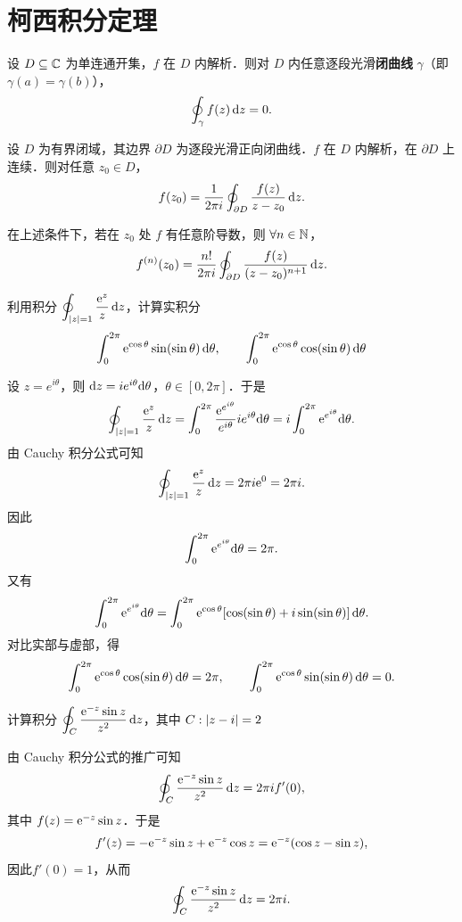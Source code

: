 \documentclass[12pt, a4paper, oneside, UTF8]{ctexbook}
\begin{document}
\section{柯西积分定理}

\begin{theorem}
设 $D\subseteq\mathbb{C}$ 为单连通开集，$f$ 在 $D$ 内解析．则对 $D$ 内任意逐段光滑\textbf{闭曲线} $\gamma$（即 $\gamma(a)=\gamma(b)$），
\[
\oint_\gamma f(z)\,\mathrm{d} z = 0.
\]
\end{theorem}

\begin{theorem}
设 $D$ 为有界闭域，其边界 $\partial D$ 为逐段光滑正向闭曲线．$f$ 在 $D$ 内解析，在 $\partial D$ 上连续．则对任意 $z_0\in D$，
\[
f(z_0) = \frac{1}{2\pi i}\oint_{\partial D}\frac{f(z)}{z-z_0}\,\mathrm{d} z.
\]
\end{theorem}

\begin{theorem}
在上述条件下，若在 $z_0$ 处 $f$ 有任意阶导数，则 $\forall n\in\mathbb{N}$，
\[
f^{(n)}(z_0) = \frac{n!}{2\pi i}\oint_{\partial D}\frac{f(z)}{(z-z_0)^{n+1}}\,\mathrm{d} z.
\]
\end{theorem}
\begin{example}
    利用积分 $\displaystyle\oint_{\abs{z}=1}\frac{\mathrm{e}^z}{z}\,\mathrm{d} z$，计算实积分
    \[\int_0^{2\pi}\mathrm{e}^{\cos\theta}\sin(\sin\theta)\,\mathrm{d} \theta,\qquad\int_0^{2\pi}\mathrm{e}^{\cos\theta}\cos(\sin\theta)\,\mathrm{d} \theta\]
\end{example}
\begin{solution}
    
    设 $z = e^{i\theta}$，则 $\mathrm{d} z = i e^{i\theta}\mathrm{d}\theta$，$\theta\in[0,2\pi]$．于是
    \[
    \oint_{\abs{z}=1}\frac{\mathrm{e}^z}{z}\,\mathrm{d} z = \int_0^{2\pi}\frac{\mathrm{e}^{e^{i\theta}}}{e^{i\theta}} i e^{i\theta}\mathrm{d}\theta = i\int_0^{2\pi}\mathrm{e}^{e^{i\theta}}\mathrm{d}\theta.
    \]
    由 Cauchy 积分公式可知
    \[
    \oint_{\abs{z}=1}\frac{\mathrm{e}^z}{z}\,\mathrm{d} z = 2\pi i\mathrm{e}^0 = 2\pi i.
    \]
    因此
    \[
    \int_0^{2\pi}\mathrm{e}^{e^{i\theta}}\mathrm{d}\theta = 2\pi.
    \]
    又有
    \[
    \int_0^{2\pi}\mathrm{e}^{e^{i\theta}}\mathrm{d}\theta = \int_0^{2\pi}\mathrm{e}^{\cos\theta}[\cos(\sin\theta)+i\sin(\sin\theta)]\,\mathrm{d} \theta.
    \]
    对比实部与虚部，得
    \[
    \int_0^{2\pi}\mathrm{e}^{\cos\theta}\cos(\sin\theta)\,\mathrm{d} \theta = 2\pi,\qquad
    \int_0^{2\pi}\mathrm{e}^{\cos\theta}\sin(\sin\theta)\,\mathrm{d} \theta = 0.
    \]
\end{solution}
\begin{example}
    计算积分 $\displaystyle\oint_C\frac{\mathrm{e}^{-z}\sin z}{z^2}\,\mathrm{d} z$，其中 $C:\abs{z-i}=2$
\end{example}
\begin{solution}
    由 Cauchy 积分公式的推广可知
    \[
    \oint_C\frac{\mathrm{e}^{-z}\sin z}{z^2}\,\mathrm{d} z = 2\pi i f'(0),
    \]
    其中 $f(z) = \mathrm{e}^{-z}\sin z$．于是
    \[
    f'(z) = -\mathrm{e}^{-z}\sin z + \mathrm{e}^{-z}\cos z = \mathrm{e}^{-z}(\cos z - \sin z),
    \]
    因此$f'(0) = 1$，从而
    \[
    \oint_C\frac{\mathrm{e}^{-z}\sin z}{z^2}\,\mathrm{d} z = 2\pi i.
    \]
\end{solution}
\end{document}

